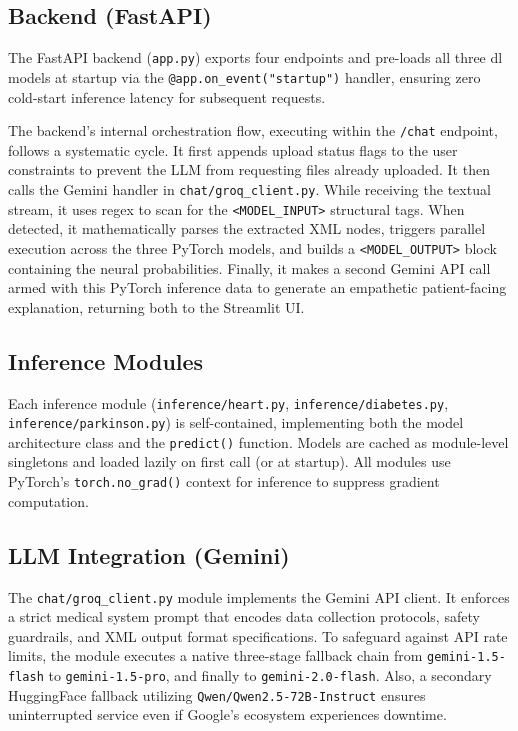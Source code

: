\subsection{Backend (FastAPI)}

The FastAPI backend (\texttt{app.py}) exports four endpoints and pre-loads all three \ac{dl} models at startup via the \texttt{@app.on\_event("startup")} handler, ensuring zero cold-start inference latency for subsequent requests.

The backend's internal orchestration flow, executing within the \texttt{/chat} endpoint, follows a systematic cycle. It first appends upload status flags to the user constraints to prevent the LLM from requesting files already uploaded. It then calls the Gemini handler in \texttt{chat/groq\_client.py}. While receiving the textual stream, it uses regex to scan for the \texttt{<MODEL\_INPUT>} structural tags. When detected, it mathematically parses the extracted XML nodes, triggers parallel execution across the three PyTorch models, and builds a \texttt{<MODEL\_OUTPUT>} block containing the neural probabilities. Finally, it makes a second Gemini API call armed with this PyTorch inference data to generate an empathetic patient-facing explanation, returning both to the Streamlit UI.

\subsection{Inference Modules}

Each inference module (\texttt{inference/heart.py}, \texttt{inference/diabetes.py}, \texttt{inference/parkinson.py}) is self-contained, implementing both the model architecture class and the \texttt{predict()} function. Models are cached as module-level singletons and loaded lazily on first call (or at startup). All modules use PyTorch's \texttt{torch.no\_grad()} context for inference to suppress gradient computation.

\subsection{LLM Integration (Gemini)}

The \texttt{chat/groq\_client.py} module implements the Gemini API client. It enforces a strict medical system prompt that encodes data collection protocols, safety guardrails, and XML output format specifications. To safeguard against API rate limits, the module executes a native three-stage fallback chain from \texttt{gemini-1.5-flash} to \texttt{gemini-1.5-pro}, and finally to \texttt{gemini-2.0-flash}. Also, a secondary HuggingFace fallback utilizing \texttt{Qwen/Qwen2.5-72B-Instruct} ensures uninterrupted service even if Google's ecosystem experiences downtime.

